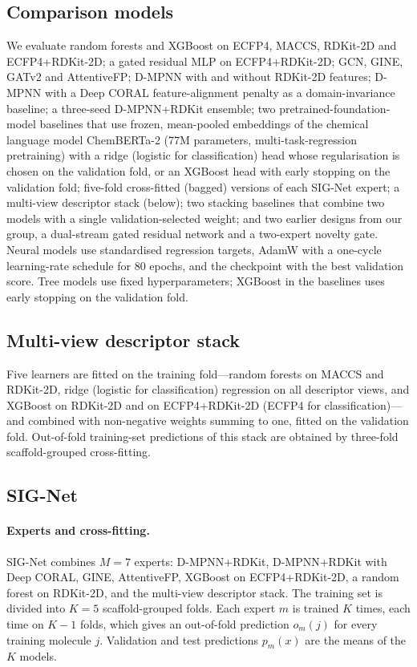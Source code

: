 \documentclass[journal=jcisd8,manuscript=article]{achemso}
\begin{document}
\subsection{Comparison models}
We evaluate random forests and XGBoost on ECFP4, MACCS, RDKit-2D and ECFP4+RDKit-2D; a gated residual MLP on ECFP4+RDKit-2D; GCN\cite{kipf2017semi}, GINE\cite{xu2019powerful}, GATv2\cite{brody2022attentive} and AttentiveFP\cite{xiong2020pushing}; D-MPNN\cite{yang2019analyzing} with and without RDKit-2D features; D-MPNN with a Deep CORAL\cite{sun2016deep} feature-alignment penalty as a domain-invariance baseline; a three-seed D-MPNN+RDKit ensemble\cite{lakshminarayanan2017simple}; two pretrained-foundation-model baselines that use frozen, mean-pooled embeddings of the chemical language model ChemBERTa-2 (77M parameters, multi-task-regression pretraining\cite{ahmad2022chemberta2}) with a ridge (logistic for classification) head whose regularisation is chosen on the validation fold, or an XGBoost head with early stopping on the validation fold; five-fold cross-fitted (bagged) versions of each SIG-Net expert; a multi-view descriptor stack (below); two stacking baselines that combine two models with a single validation-selected weight; and two earlier designs from our group, a dual-stream gated residual network and a two-expert novelty gate. Neural models use standardised regression targets, AdamW with a one-cycle learning-rate schedule for 80 epochs, and the checkpoint with the best validation score. Tree models use fixed hyperparameters; XGBoost in the baselines uses early stopping on the validation fold.

\subsection{Multi-view descriptor stack}
Five learners are fitted on the training fold---random forests on MACCS and RDKit-2D, ridge (logistic for classification) regression on all descriptor views, and XGBoost on RDKit-2D and on ECFP4+RDKit-2D (ECFP4 for classification)---and combined with non-negative weights summing to one, fitted on the validation fold. Out-of-fold training-set predictions of this stack are obtained by three-fold scaffold-grouped cross-fitting.

\subsection{SIG-Net}
\paragraph{Experts and cross-fitting.} SIG-Net combines $M = 7$ experts: D-MPNN+RDKit, D-MPNN+RDKit with Deep CORAL, GINE, AttentiveFP, XGBoost on ECFP4+RDKit-2D, a random forest on RDKit-2D, and the multi-view descriptor stack. The training set is divided into $K = 5$ scaffold-grouped folds. Each expert $m$ is trained $K$ times, each time on $K-1$ folds, which gives an out-of-fold prediction $o_m(j)$ for every training molecule $j$. Validation and test predictions $p_m(x)$ are the means of the $K$ models.
\end{document}
